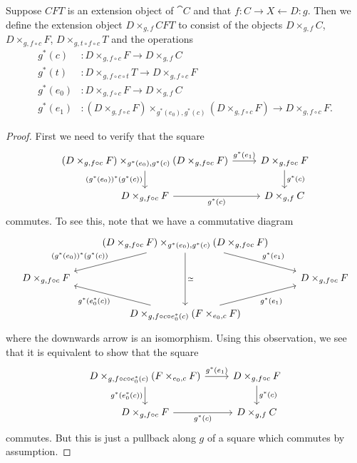 \begin{defn}
Suppose $CFT$ is an extension object of $\cat{C}$ and that $f:C\rightarrow X\leftarrow D:g$.
Then we define the extension object $D\times_{g,f} CFT$ to consist of the objects $D\times_{g,f} C$,
$D\times_{g,f\circ c} F$, $D\times_{g,t\circ f\circ c} T$ and the operations
\begin{align*}
g^\ast(c) & : D\times_{g,f\circ c} F\to D\times_{g,f} C\\
g^\ast(t) & : D\times_{g,f\circ c\circ t} T\to D\times_{g,f\circ c} F\\
g^\ast(e_0) & : D\times_{g,f\circ c} F\to D\times_{g,f} C\\
g^\ast(e_1) & : (D\times_{g,f\circ c} F) \times_{g^\ast(e_0),g^\ast(c)} (D\times_{g,f\circ c} F)\to D\times_{g,f\circ c} F.
\end{align*}
\end{defn}

\begin{proof}
First we need to verify that the square
\begin{equation*}
\begin{tikzcd}
(D\times_{g,f\circ c} F) \times_{g^\ast(e_0),g^\ast(c)} (D\times_{g,f\circ c} F)
  \ar{r}{g^\ast(e_1)} 
  \ar{d}[swap]{(g^\ast(e_0))^\ast(g^\ast(c))} 
  & 
D\times_{g,f\circ c} F
  \ar{d}{g^\ast(c)}
  \\
D\times_{g,f\circ c} F
  \ar{r}[swap]{g^\ast(c)} 
  & 
D\times_{g,f} C
\end{tikzcd}
\end{equation*}
commutes. To see this, note that we have a commutative diagram
\begin{equation*}
\begin{tikzcd}
  {}
  &
(D\times_{g,f\circ c} F)\times_{g^\ast(e_0),g^\ast(c)}(D\times_{g,f\circ c} F)
  \ar{dr}{g^\ast(e_1)}
  \ar{dl}[swap]{(g^\ast(e_0))^\ast(g^\ast(c))}
  \ar{dd}{\simeq}
  &
  \\
D\times_{g,f\circ c} F
  &
  &
D\times_{g,f\circ c} F
  \\
  &
D\times_{g,f\circ c\circ e_0^\ast(c)}(F\times_{e_0,c} F)
  \ar{ul}{g^\ast(e_0^\ast(c))}
  \ar{ur}[swap]{g^\ast(e_1)}
\end{tikzcd}
\end{equation*}
where the downwards arrow is an isomorphism. Using this observation, we see that
it is equivalent to show that the square
\begin{equation*}
\begin{tikzcd}
D\times_{g,f\circ c\circ e_0^\ast(c)}(F\times_{e_0,c} F)
  \ar{r}{g^\ast(e_1)} 
  \ar{d}[swap]{g^\ast(e_0^\ast(c))} 
  & 
D\times_{g,f\circ c} F
  \ar{d}{g^\ast(c)}
  \\
D\times_{g,f\circ c} F
  \ar{r}[swap]{g^\ast(c)} 
  & 
D\times_{g,f} C
\end{tikzcd}
\end{equation*}
commutes. But this is just a pullback along $g$ of a square which commutes by assumption.
\end{proof}

